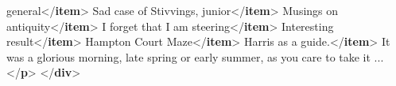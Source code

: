 \begin{shaded}
\hspace*{1em}\hspace*{1em}\hspace*{1em}\hspace*{1em}\hspace*{1em}\hspace*{1em} general{</\textbf{item}>}\mbox{}\newline 
\hspace*{1em}\hspace*{1em}Sad case of Stivvings, junior{</\textbf{item}>}\mbox{}\newline 
\hspace*{1em}\hspace*{1em}Musings on antiquity{</\textbf{item}>}\mbox{}\newline 
\hspace*{1em}\hspace*{1em}I forget that I am steering{</\textbf{item}>}\mbox{}\newline 
\hspace*{1em}\hspace*{1em}Interesting result{</\textbf{item}>}\mbox{}\newline 
\hspace*{1em}\hspace*{1em}Hampton Court Maze{</\textbf{item}>}\mbox{}\newline 
\hspace*{1em}\hspace*{1em}Harris as a guide.{</\textbf{item}>}\mbox{}\newline 
\hspace*{1em}\mbox{}\newline 
{}\mbox{}\newline 
{}It was a glorious morning, late spring or early summer, as you\mbox{}\newline 
\hspace*{1em}\hspace*{1em} care to take it ...{</\textbf{p}>}\mbox{}\newline 
{</\textbf{div}>}\end{shaded}\egroup\par \par

